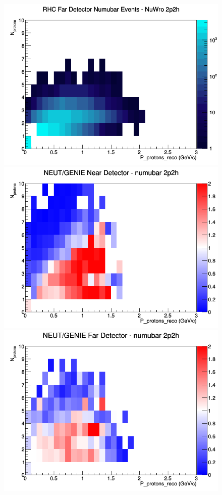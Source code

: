 \begin{figure}[h]
\endminipage
{}
\includegraphics[width=\linewidth]{eff_N_P/GAr/protons/2p2h_RHC_FD_numubar_N_P_NuWro.png}
\endminipage
\newline
{}
\includegraphics[width=\linewidth]{eff_N_P/GAr/protons/ratios/2p2h_NEUT_GENIE_numubar_near_N_P.png}
\endminipage
{}
\includegraphics[width=\linewidth]{eff_N_P/GAr/protons/ratios/2p2h_NEUT_GENIE_numubar_far_N_P.png}

\end{figure}
